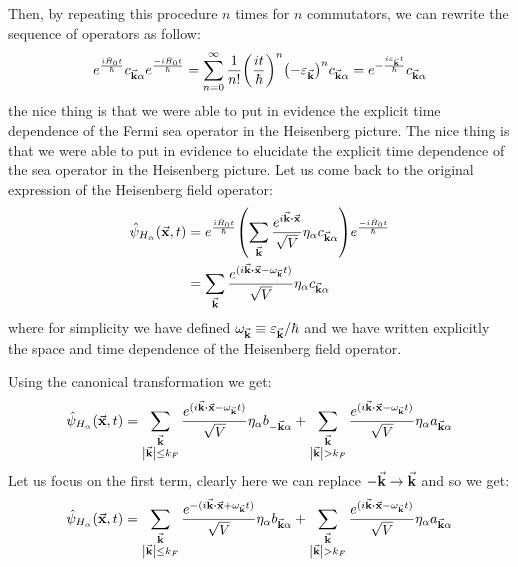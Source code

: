 \documentclass[../main/main.tex]{subfiles}
\begin{document}
Then, by repeating this procedure \( n \) times for \( n \) commutators, we can rewrite the sequence of operators as follow:
\begin{equation*}
  e^{\frac{i \hat{H}_0 t}{\hbar }}  c_{\va{k}\alpha }
  e^{\frac{- i \hat{H}_0 t}{\hbar }}
  = \sum_{n=0}^{\infty }
  \frac{1}{n!} \qty(\frac{i t}{\hbar })^n
  \qty(- \varepsilon _{\va{k}})^n c_{\va{k}\alpha }
  = e^{-\frac{ i \varepsilon _{\va{k}} t}{\hbar }} c_{\va{k}\alpha }
\end{equation*}
the nice thing is that we were able to put in evidence the explicit time dependence of the Fermi sea operator in the Heisenberg picture.
The nice thing is that we were able to put in evidence to elucidate the explicit time dependence of the sea operator in the Heisenberg picture.
Let us come back to the original expression of the Heisenberg field operator:
\begin{equation*}
     \begin{split}
   \hat{\psi }_{H_ \alpha } (\va{x},t) &=
   e^{\frac{i \hat{H}_0 t}{\hbar }} \qty(
   \sum_{\va{k}}^{} \frac{e^{i \va{k}\vdot \va{x}} }{\sqrt{V} } \eta _ \alpha c_{\va{k}\alpha }
   )  e^{\frac{- i \hat{H}_0 t}{\hbar }}  \\
   &=
   \sum_{\va{k}}^{}
    \frac{e^{ (i \va{k}\vdot \va{x} - \omega _{\va{k}} t)} }{\sqrt{V} } \eta _ \alpha c_{\va{k}\alpha }
   \end{split}
\end{equation*}
where for simplicity we have defined \( \omega _{\va{k}} \equiv \varepsilon _{\va{k}}/\hbar  \) and we have written explicitly the space and time dependence of the Heisenberg field operator.

Using the canonical transformation we get:
\begin{equation*}
  \hat{\psi }_{H_ \alpha } (\va{x},t) =
  \sum_{\substack{\va{k} \\ \abs{\va{k}} \le k_F  } }^{}
    \frac{e^{ (i \va{k}\vdot \va{x} - \omega _{\va{k}} t)} }{\sqrt{V} } \eta _ \alpha b_{-\va{k}\alpha }
    +
    \sum_{\substack{\va{k} \\ \abs{\va{k}} > k_F  } }^{}
      \frac{e^{ (i \va{k}\vdot \va{x} - \omega _{\va{k}} t)} }{\sqrt{V} } \eta _ \alpha a_{\va{k}\alpha }
\end{equation*}
Let us focus on the first term, clearly here we can replace \( -\va{k} \rightarrow \va{k} \) and so we get:
\begin{equation*}
  \hat{\psi }_{H_ \alpha } (\va{x},t) =
  \sum_{\substack{\va{k} \\ \abs{\va{k}} \le k_F  } }^{}
    \frac{e^{ -(i \va{k}\vdot \va{x} + \omega _{\va{k}} t)} }{\sqrt{V} } \eta _ \alpha b_{\va{k}\alpha }
    +
    \sum_{\substack{\va{k} \\ \abs{\va{k}} > k_F  } }^{}
      \frac{e^{ (i \va{k}\vdot \va{x} - \omega _{\va{k}} t)} }{\sqrt{V} } \eta _ \alpha a_{\va{k}\alpha }
\end{equation*}
\end{document}

